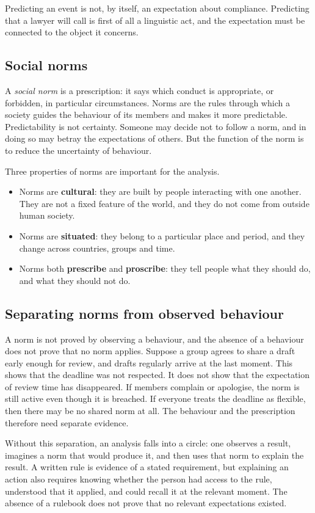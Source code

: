 Predicting an event is not, by itself, an expectation about compliance. Predicting that a lawyer will call is first of all a linguistic act, and the expectation must be connected to the object it concerns.

\subsection{Social norms}
A \emph{social norm} is a prescription: it says which conduct is appropriate, or forbidden, in particular circumstances. Norms are the rules through which a society guides the behaviour of its members and makes it more predictable. Predictability is not certainty. Someone may decide not to follow a norm, and in doing so may betray the expectations of others. But the function of the norm is to reduce the uncertainty of behaviour.

Three properties of norms are important for the analysis.
\begin{itemize}
	\item Norms are \textbf{cultural}: they are built by people interacting with one another. They are not a fixed feature of the world, and they do not come from outside human society.
	\item Norms are \textbf{situated}: they belong to a particular place and period, and they change across countries, groups and time.
	\item Norms both \textbf{prescribe} and \textbf{proscribe}: they tell people what they should do, and what they should not do.
\end{itemize}

\subsection{Separating norms from observed behaviour}
A norm is not proved by observing a behaviour, and the absence of a behaviour does not prove that no norm applies. Suppose a group agrees to share a draft early enough for review, and drafts regularly arrive at the last moment. This shows that the deadline was not respected. It does not show that the expectation of review time has disappeared. If members complain or apologise, the norm is still active even though it is breached. If everyone treats the deadline as flexible, then there may be no shared norm at all. The behaviour and the prescription therefore need separate evidence.

Without this separation, an analysis falls into a circle: one observes a result, imagines a norm that would produce it, and then uses that norm to explain the result. A written rule is evidence of a stated requirement, but explaining an action also requires knowing whether the person had access to the rule, understood that it applied, and could recall it at the relevant moment. The absence of a rulebook does not prove that no relevant expectations existed.

